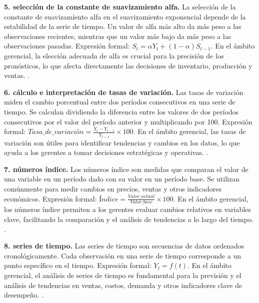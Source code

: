 {\textbf{5. selección de la constante de suavizamiento alfa.} La selección de la constante de suavizamiento alfa en el suavizamiento exponencial depende de la estabilidad de la serie de tiempo. Un valor de alfa más alto da más peso a las observaciones recientes, mientras que un valor más bajo da más peso a las observaciones pasadas. Expresión formal: $S_t = \alpha Y_t + (1 - \alpha) S_{t-1}$. En el ámbito gerencial, la elección adecuada de alfa es crucial para la precisión de los pronósticos, lo que afecta directamente las decisiones de inventario, producción y ventas. \citep{anderson2012,lind2012,wackerly2010}.

\textbf{6. cálculo e interpretación de tasas de variación.} Las tasas de variación miden el cambio porcentual entre dos períodos consecutivos en una serie de tiempo. Se calculan dividiendo la diferencia entre los valores de dos períodos consecutivos por el valor del período anterior y multiplicando por 100. Expresión formal: $Tasa\_de\_variación = \frac{Y_t - Y_{t-1}}{Y_{t-1}} \times 100$. En el ámbito gerencial, las tasas de variación son útiles para identificar tendencias y cambios en los datos, lo que ayuda a los gerentes a tomar decisiones estratégicas y operativas. \citep{anderson2012,lind2012,wackerly2010}.

\textbf{7. números índice.} Los números índice son medidas que comparan el valor de una variable en un período dado con su valor en un período base. Se utilizan comúnmente para medir cambios en precios, ventas y otros indicadores económicos. Expresión formal: $Índice = \frac{Valor\_actual}{Valor\_base} \times 100$. En el ámbito gerencial, los números índice permiten a los gerentes evaluar cambios relativos en variables clave, facilitando la comparación y el análisis de tendencias a lo largo del tiempo. \citep{anderson2012,lind2012,wackerly2010}.

\textbf{8. series de tiempo.} Las series de tiempo son secuencias de datos ordenados cronológicamente. Cada observación en una serie de tiempo corresponde a un punto específico en el tiempo. Expresión formal: $Y_t = f(t)$. En el ámbito gerencial, el análisis de series de tiempo es fundamental para la previsión y el análisis de tendencias en ventas, costos, demanda y otros indicadores clave de desempeño. \citep{anderson2012,lind2012,wackerly2010}.


}
